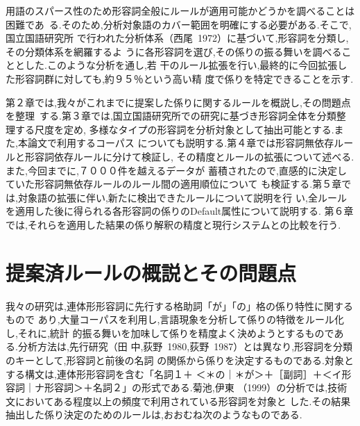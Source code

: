 用語のスパース性のため形容詞全般にルールが適用可能かどうかを調べることは\mbox{困難であ
る.}そのため,分析対象語のカバー範囲を明確にする必要がある.そこで,国立国語研究所
で行われた分析体系（西尾~1972）に基づいて,形容詞を分類し,その分類体系を網羅するよ
うに各形容詞を選び,その係りの振る舞いを調べることとした.このような分析を通し,若
干のルール拡張を行い,最終的に今回拡張した形容詞群に対しても,約９５％という高い精
度で係りを特定できることを示す.

第２章では,我々がこれまでに提案した係りに関するルールを概説し,その問題点を\mbox{整理
する.}第３章では,国立国語研究所での研究に基づき形容詞全体を分類整理する尺度を定め,
多様なタイプの形容詞を分析対象として抽出可能とする.また,本論文で利用するコーパス
についても説明する.第４章では形容詞無依存ルールと形容詞依存ルールに分けて検証し,
その精度とルールの拡張について述べる.また,今回までに,７０００件を越えるデータが
蓄積されたので,直感的に決定していた形容詞無依存ルールのルール間の適用順位について
も検証する.第５章では,対象語の拡張に伴い,新たに検出できたルールについて説明を行
い,全ルールを適用した後に得られる各形容詞の係りのDefault属性について説明する.
第６章では,それらを適用した結果の係り解釈の精度と現行システムとの比較を行う.


\section{提案済ルールの概説とその問題点}

我々の研究は,連体形形容詞に先行する格助詞「が」「の」格の係り特性に関するもので
あり,大量コーパスを利用し,言語現象を分析して係りの特徴をルール化し,それに,統計
的振る舞いを加味して係りを精度よく決めようとするものである.分析方法は,先行研究（田
中,荻野~1980,荻野~1987）とは異なり,形容詞を分類のキーとして,形容詞と前後の名詞
の関係から係りを決定するものである.対象とする構文は,連体形形容詞を含む「名詞１＋
＜＊の｜＊が＞＋［副詞］＋＜イ形容詞｜ナ形容詞＞＋名詞２」の形式である.菊池,伊東
（1999）の分析では,技術文においてある程度以上の頻度で利用されている形容詞を対象と
した.その結果抽出した係り決定のためのルールは,おおむね次のようなものである.

